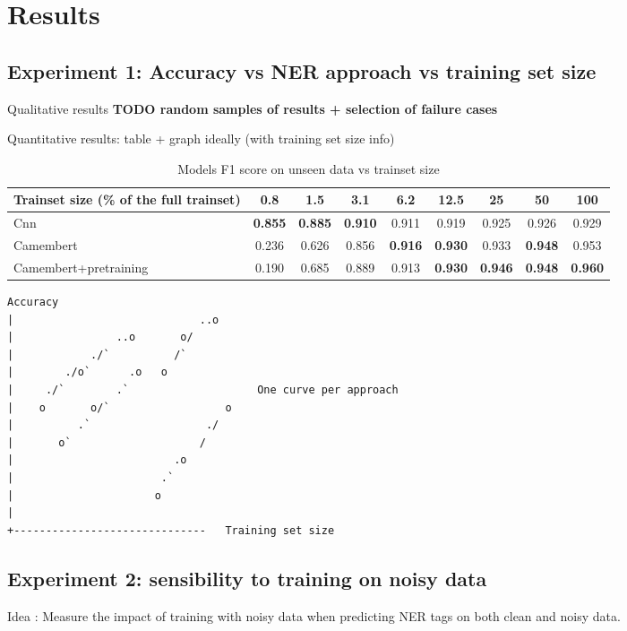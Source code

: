 \section{Results}

\subsection{Experiment 1: Accuracy vs NER approach vs training set size}

Qualitative results
\textbf{TODO random samples of results + selection of failure cases}


Quantitative results: table + graph ideally (with training set size info)

\begin{table}[!h]

\caption{Models F1 score on unseen data vs trainset size}
\centering
\begin{tabular}[t]{lcccccccc}
\toprule
Trainset size (\% of the full trainset) & 0.8 & 1.5 & 3.1 & 6.2 & 12.5 & 25 & 50 & 100\\
\midrule
Cnn & \textbf{0.855} & \textbf{0.885} & \textbf{0.910} & 0.911 & 0.919 & 0.925 & 0.926 & 0.929\\
Camembert & 0.236 & 0.626 & 0.856 & \textbf{0.916} & \textbf{0.930} & 0.933 & \textbf{0.948} & 0.953\\
Camembert+pretraining & 0.190 & 0.685 & 0.889 & 0.913 & \textbf{0.930} & \textbf{0.946} & \textbf{0.948} & \textbf{0.960}\\
\bottomrule
\end{tabular}
\end{table}

\begin{verbatim}
Accuracy
|                             ..o   
|                ..o       o/       
|            ./`          /`          
|        ./o`      .o   o            
|     ./`        .`                    One curve per approach
|    o       o/`                  o  
|          .`                  ./    
|       o`                    /      
|                         .o        
|                       .`           
|                      o            
|                                   
+------------------------------   Training set size
\end{verbatim}
                                        

\subsection{Experiment 2: sensibility to training on noisy data}
Idea : Measure the impact of training with noisy data when predicting NER tags on both clean and noisy data.

